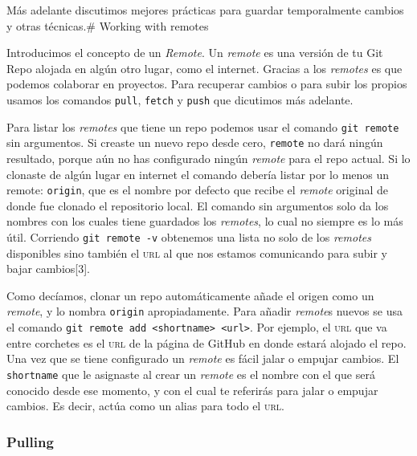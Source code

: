 \documentclass[spanish, 12pt, a4paper]{article}
\begin{document}
Más adelante discutimos mejores prácticas para guardar temporalmente
cambios y otras técnicas.\# Working with remotes

Introducimos el concepto de un \emph{Remote}. Un \emph{remote} es una
versión de tu Git Repo alojada en algún otro lugar, como el internet.
Gracias a los \emph{remotes} es que podemos colaborar en proyectos. Para
recuperar cambios o para subir los propios usamos los comandos
\passthrough{\lstinline!pull!}, \passthrough{\lstinline!fetch!} y
\passthrough{\lstinline!push!} que dicutimos más adelante.

Para listar los \emph{remotes} que tiene un repo podemos usar el comando
\passthrough{\lstinline!git remote!} sin argumentos. Si creaste un nuevo
repo desde cero, \passthrough{\lstinline!remote!} no dará ningún
resultado, porque aún no has configurado ningún \emph{remote} para el
repo actual. Si lo clonaste de algún lugar en internet el comando
debería listar por lo menos un remote: \passthrough{\lstinline!origin!},
que es el nombre por defecto que recibe el \emph{remote} original de
donde fue clonado el repositorio local. El comando sin argumentos solo
da los nombres con los cuales tiene guardados los \emph{remotes}, lo
cual no siempre es lo más útil. Corriendo
\passthrough{\lstinline!git remote -v!} obtenemos una lista no solo de
los \emph{remotes} disponibles sino también el \textsc{url} al que nos
estamos comunicando para subir y bajar cambios{[}3{]}.

Como decíamos, clonar un repo automáticamente añade el origen como un
\emph{remote}, y lo nombra \passthrough{\lstinline!origin!}
apropiadamente. Para añadir \emph{remote}s nuevos se usa el comando
\passthrough{\lstinline!git remote add <shortname> <url>!}. Por ejemplo,
el \textsc{url} que va entre corchetes es el \textsc{url} de la página
de GitHub en donde estará alojado el repo. Una vez que se tiene
configurado un \emph{remote} es fácil jalar o empujar cambios. El
\passthrough{\lstinline!shortname!} que le asignaste al crear un
\emph{remote} es el nombre con el que será conocido desde ese momento, y
con el cual te referirás para jalar o empujar cambios. Es decir, actúa
como un alias para todo el \textsc{url}.

\subsubsection{Pulling}
\end{document}
